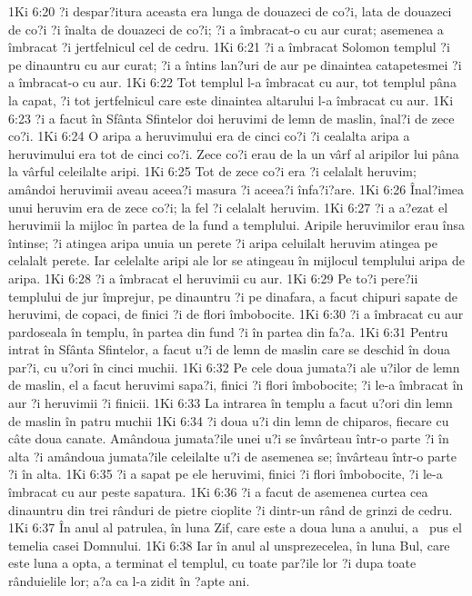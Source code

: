 1Ki 6:20  ?i despar?itura aceasta era lunga de douazeci de co?i, lata de douazeci de co?i ?i înalta de douazeci de co?i; ?i a îmbracat-o cu aur curat; asemenea a îmbracat ?i jertfelnicul cel de cedru.
1Ki 6:21  ?i a îmbracat Solomon templul ?i pe dinauntru cu aur curat; ?i a întins lan?uri de aur pe dinaintea catapetesmei ?i a îmbracat-o cu aur.
1Ki 6:22  Tot templul l-a îmbracat cu aur, tot templul pâna la capat, ?i tot jertfelnicul care este dinaintea altarului l-a îmbracat cu aur.
1Ki 6:23  ?i a facut în Sfânta Sfintelor doi heruvimi de lemn de maslin, înal?i de zece co?i.
1Ki 6:24  O aripa a heruvimului era de cinci co?i ?i cealalta aripa a heruvimului era tot de cinci co?i. Zece co?i erau de la un vârf al aripilor lui pâna la vârful celeilalte aripi.
1Ki 6:25  Tot de zece co?i era ?i celalalt heruvim; amândoi heruvimii aveau aceea?i masura ?i aceea?i înfa?i?are.
1Ki 6:26  Înal?imea unui heruvim era de zece co?i; la fel ?i celalalt heruvim.
1Ki 6:27  ?i a a?ezat el heruvimii la mijloc în partea de la fund a templului. Aripile heruvimilor erau însa întinse; ?i atingea aripa unuia un perete ?i aripa celuilalt heruvim atingea pe celalalt perete. Iar celelalte aripi ale lor se atingeau în mijlocul templului aripa de aripa.
1Ki 6:28  ?i a îmbracat el heruvimii cu aur.
1Ki 6:29  Pe to?i pere?ii templului de jur împrejur, pe dinauntru ?i pe dinafara, a facut chipuri sapate de heruvimi, de copaci, de finici ?i de flori îmbobocite.
1Ki 6:30  ?i a îmbracat cu aur pardoseala în templu, în partea din fund ?i în partea din fa?a.
1Ki 6:31  Pentru intrat în Sfânta Sfintelor, a facut u?i de lemn de maslin care se deschid în doua par?i, cu u?ori în cinci muchii.
1Ki 6:32  Pe cele doua jumata?i ale u?ilor de lemn de maslin, el a facut heruvimi sapa?i, finici ?i flori îmbobocite; ?i le-a îmbracat în aur ?i heruvimii ?i finicii.
1Ki 6:33  La intrarea în templu a facut u?ori din lemn de maslin în patru muchii
1Ki 6:34  ?i doua u?i din lemn de chiparos, fiecare cu câte doua canate. Amândoua jumata?ile unei u?i se învârteau într-o parte ?i în alta ?i amândoua jumata?ile celeilalte u?i de asemenea se; învârteau într-o parte ?i în alta.
1Ki 6:35  ?i a sapat pe ele heruvimi, finici ?i flori îmbobocite, ?i le-a îmbracat cu aur peste sapatura.
1Ki 6:36  ?i a facut de asemenea curtea cea dinauntru din trei rânduri de pietre cioplite ?i dintr-un rând de grinzi de cedru.
1Ki 6:37  În anul al patrulea, în luna Zif, care este a doua luna a anului, a  pus el temelia casei Domnului.
1Ki 6:38  Iar în anul al unsprezecelea, în luna Bul, care este luna a opta, a terminat el templul, cu toate par?ile lor ?i dupa toate rânduielile lor; a?a ca l-a zidit în ?apte ani.
